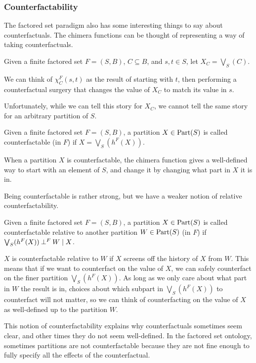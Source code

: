 \documentclass[authordate,onecolumn]{miri-tech-article}
\begin{document}
\subsubsection{Counterfactability}
The factored set paradigm also has some interesting things to say about counterfactuals. The chimera functions can be thought of representing a way of taking counterfactuals.

Given a finite factored set $F=(S,B)$, $C\subseteq B$, and $s,t\in S$, let $X_C=\bigvee_S(C)$.

We can think of $\chi_C^F(s,t)$ as the result of starting with $t$, then performing a counterfactual surgery that changes the value of $X_C$ to match its value in $s$.

Unfortunately, while we can tell this story for $X_C$, we cannot tell the same story for an arbitrary partition of $S$.

\begin{definition}[counterfactability]
Given a finite factored set $F=(S,B)$, a partition $X\in \text{Part}(S)$ is called counterfactable (in $F$) if $X=\bigvee_S(h^F(X))$.
\end{definition}

When a partition $X$ is counterfactable, the chimera function gives a well-defined way to start with an element of $S$, and change it by changing what part in $X$ it is in.

Being counterfactable is rather strong, but we have a weaker notion of relative counterfactability. 

\begin{definition}
Given a finite factored set $F=(S,B)$, a partition $X\in \text{Part}(S)$ is called counterfactable relative to another partition $W\in \text{Part}(S)$ (in $F$) if $\bigvee_S(h^F(X))\mathbin{\perp^{F}}W\mid X$.
\end{definition}

$X$ is counterfactable relative to $W$ if $X$ screens off the history of $X$ from $W$. This means that if we want to counterfact on the value of $X$, we can safely counterfact on the finer partition $\bigvee_S(h^F(X))$. As long as we only care about what part in $W$ the result is in, choices about which subpart in $\bigvee_S(h^F(X))$ to counterfact will not matter, so we can think of counterfacting on the value of $X$ as well-defined up to the partition $W$.

This notion of counterfactability explains why counterfactuals sometimes seem clear, and other times they do not seem well-defined. In the factored set ontology, sometimes partitions are not counterfactable because they are not fine enough to fully specify all the effects of the counterfactual. 
\end{document}

